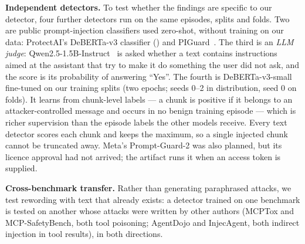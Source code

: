 \documentclass[conference,compsoc]{IEEEtran}
\begin{document}
\textbf{Independent detectors.} To test whether the findings are specific to our detector, four further detectors run on the same episodes, splits and folds. Two are public prompt-injection classifiers used zero-shot, without training on our data: ProtectAI's DeBERTa-v3 classifier () and PIGuard~\cite{Li2025PIGuard}. The third is an \emph{LLM judge}: Qwen2.5-1.5B-Instruct~\cite{Qwen2024Qwen25} is asked whether a text contains instructions aimed at the assistant that try to make it do something the user did not ask, and the score is its probability of answering ``Yes''. The fourth is DeBERTa-v3-small~\cite{He2023DeBERTaV3} fine-tuned on our training splits (two epochs; seeds 0--2 in distribution, seed 0 on folds). It learns from chunk-level labels --- a chunk is positive if it belongs to an attacker-controlled message and occurs in no benign training episode --- which is richer supervision than the episode labels the other models receive. Every text detector scores each chunk and keeps the maximum, so a single injected chunk cannot be truncated away. Meta's Prompt-Guard-2 was also planned, but its licence approval had not arrived; the artifact runs it when an access token is supplied.

\textbf{Cross-benchmark transfer.} Rather than generating paraphrased attacks, we test rewording with text that already exists: a detector trained on one benchmark is tested on another whose attacks were written by other authors (MCPTox and MCP-SafetyBench, both tool poisoning; AgentDojo and InjecAgent, both indirect injection in tool results), in both directions.
\end{document}
